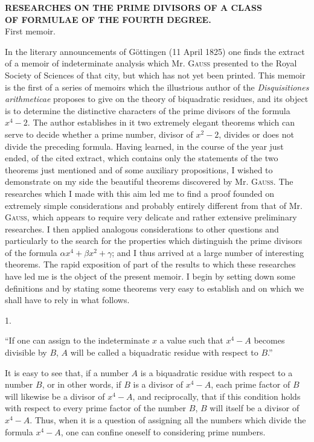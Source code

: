 \documentclass[11pt]{article}
\newcommand{\unitid}[1]{\hypertarget{#1}{}}
\begin{document}
\begin{center}
{\Large\bfseries RESEARCHES ON THE PRIME DIVISORS OF A CLASS\\
OF FORMULAE OF THE FOURTH DEGREE.}\\[1.2em]
{First memoir.}
\end{center}

\unitid{dirichlet.v1.p04a.en.par.001}In the literary announcements of Göttingen (11 April 1825) one finds the extract of a memoir of indeterminate analysis which Mr. \textsc{Gauss} presented to the Royal Society of Sciences of that city, but which has not yet been printed. This memoir is the first of a series of memoirs which the illustrious author of the \emph{Disquisitiones arithmeticae} proposes to give on the theory of biquadratic residues, and its object is to determine the distinctive characters of the prime divisors of the formula $x^4-2$. The author establishes in it two extremely elegant theorems which can serve to decide whether a prime number, divisor of $x^2-2$, divides or does not divide the preceding formula. Having learned, in the course of the year just ended, of the cited extract, which contains only the statements of the two theorems just mentioned and of some auxiliary propositions, I wished to demonstrate on my side the beautiful theorems discovered by Mr. \textsc{Gauss}. The researches which I made with this aim led me to find a proof founded on extremely simple considerations and probably entirely different from that of Mr. \textsc{Gauss}, which appears to require very delicate and rather extensive preliminary researches. I then applied analogous considerations to other questions and particularly to the search for the properties which distinguish the prime divisors of the formula $\alpha x^4+\beta x^2+\gamma$; and I thus arrived at a large number of interesting theorems. The rapid exposition of part of the results to which these researches have led me is the object of the present memoir. I begin by setting down some definitions and by stating some theorems very easy to establish and on which we shall have to rely in what follows.

\begin{center}1.\end{center}

\unitid{dirichlet.v1.p04a.en.par.002}“If one can assign to the indeterminate $x$ a value such that $x^4-A$ becomes divisible by $B$, $A$ will be called a biquadratic residue with respect to $B$.”

\unitid{dirichlet.v1.p04a.en.par.003}It is easy to see that, if a number $A$ is a biquadratic residue with respect to a number $B$, or in other words, if $B$ is a divisor of $x^4-A$, each prime factor of $B$ will likewise be a divisor of $x^4-A$, and reciprocally, that if this condition holds with respect to every prime factor of the number $B$, $B$ will itself be a divisor of $x^4-A$. Thus, when it is a question of assigning all the numbers which divide the formula $x^4-A$, one can confine oneself to considering prime numbers.
\end{document}
